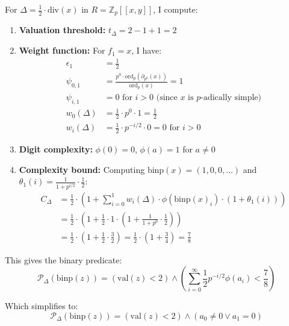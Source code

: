 \begin{example}
For $\Delta = \frac{1}{2} \cdot \text{div}(x)$ in $R = \mathbb{Z}_p[[x,y]]$, I compute:

\begin{enumerate}
    \item \textbf{Valuation threshold:} $t_\Delta = 2 - 1 + 1 = 2$
    
    \item \textbf{Weight function:} For $f_1 = x$, I have:
    \begin{align*}
    \epsilon_1 &= \frac{1}{2} \\
    \psi_{0,1} &= \frac{p^0 \cdot \text{ord}_p(\partial_{p^0}(x))}{\text{ord}_p(x)} = 1 \\
    \psi_{i,1} &= 0 \text{ for } i > 0 \text{ (since $x$ is $p$-adically simple)} \\
    w_0(\Delta) &= \frac{1}{2} \cdot p^0 \cdot 1 = \frac{1}{2} \\
    w_i(\Delta) &= \frac{1}{2} \cdot p^{-i/2} \cdot 0 = 0 \text{ for } i > 0
    \end{align*}
    
    \item \textbf{Digit complexity:} $\phi(0) = 0$, $\phi(a) = 1$ for $a \neq 0$
    
    \item \textbf{Complexity bound:} Computing $\text{binp}(x) = (1, 0, 0, \ldots)$ and $\theta_1(i) = \frac{1}{1 + p^{i/2}} \cdot \frac{1}{2}$:
    \begin{align*}
    C_\Delta &= \frac{1}{2} \cdot \left(1 + \sum_{i=0}^{1} w_i(\Delta) \cdot \phi(\text{binp}(x)_i) \cdot (1 + \theta_1(i))\right) \\
    &= \frac{1}{2} \cdot \left(1 + \frac{1}{2} \cdot 1 \cdot (1 + \frac{1}{1 + p^0} \cdot \frac{1}{2})\right) \\
    &= \frac{1}{2} \cdot (1 + \frac{1}{2} \cdot \frac{3}{2}) = \frac{1}{2} \cdot (1 + \frac{3}{4}) = \frac{7}{8}
    \end{align*}
\end{enumerate}

This gives the binary predicate:
$$\mathcal{P}_\Delta(\text{binp}(z)) = (\text{val}(z) < 2) \wedge \left(\sum_{i=0}^{\infty} \frac{1}{2} p^{-i/2} \phi(a_i) < \frac{7}{8}\right)$$

Which simplifies to:
$$\mathcal{P}_\Delta(\text{binp}(z)) = (\text{val}(z) < 2) \wedge (a_0 \neq 0 \vee a_1 = 0)$$
\end{example}

